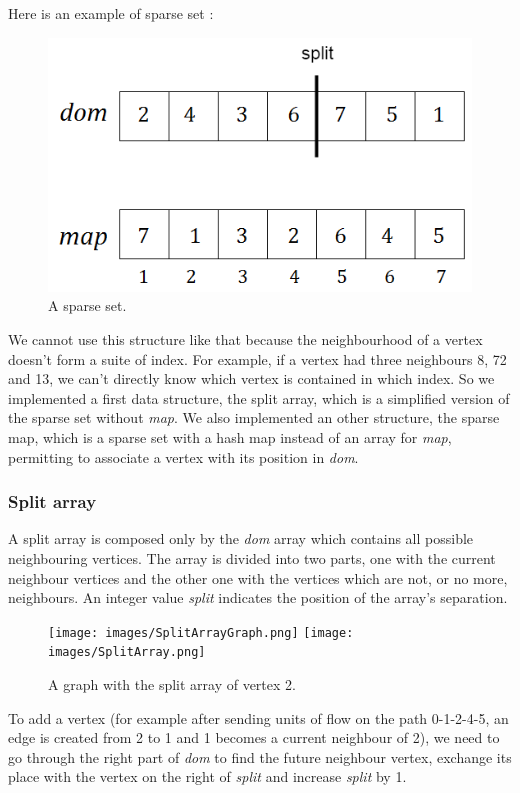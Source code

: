 Here is an example of sparse set : 
\begin{figure}[H]
\begin{center}
\includegraphics[scale=0.5]{images/sparseset.png}
\end{center}
\caption{A sparse set.}
\end{figure}
We cannot use this structure like that because the neighbourhood of a vertex doesn't form a suite of index. For example, if a vertex had three neighbours 8, 72 and 13, we can't directly know which vertex is contained in which index.
So we implemented a first data structure, the split array, which is a simplified version of the sparse set without \textit{map}. We also implemented an other structure, the sparse map, which is a sparse set with a hash map instead of an array for \textit{map}, permitting to associate a vertex with its position in \textit{dom}.
\newpage
\subsubsection{Split array}
A split array is composed only by the \textit{dom} array which contains all possible neighbouring vertices. The array is divided into two parts, one with the current neighbour vertices and the other one with the vertices which are not, or no more, neighbours. An integer value \textit{split} indicates the position of the array's separation.
\begin{figure}[H]
\texttt{[image: images/SplitArrayGraph.png]}\hfill
\texttt{[image: images/SplitArray.png]}
\caption{A graph with the split array of vertex 2.}
\end{figure}
To add a vertex (for example after sending units of flow on the path 0-1-2-4-5, an edge is created from 2 to 1 and 1 becomes a current neighbour of 2), we need to go through the right part of \textit{dom} to find the future neighbour vertex, exchange its place with the vertex on the right of \textit{split} and increase \textit{split} by 1. \newline


